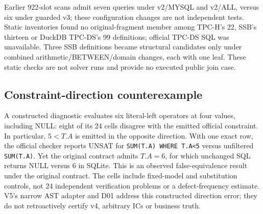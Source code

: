 Earlier 922-slot scans admit seven queries under v2/MYSQL and v2/ALL, versus six under guarded v3; these configuration changes are not independent tests. Static inventories found no original-fragment member among TPC-H's 22, SSB's thirteen or DuckDB TPC-DS's 99 definitions; official TPC-DS SQL was unavailable. Three SSB definitions became structural candidates only under combined arithmetic/BETWEEN/domain changes, each with one leaf. These static checks are not solver runs and provide no executed public join case.

\subsection{Constraint-direction counterexample}\label{sec:icdiagnostic}
A constructed diagnostic evaluates six literal-left operators at four values, including NULL: eight of its 24 cells disagree with the emitted official constraint. In particular, $5<T.A$ is emitted in the opposite direction. With one exact row, the official checker reports UNSAT for \texttt{SUM(T.A) WHERE T.A<5} versus unfiltered \texttt{SUM(T.A)}. Yet the original contract admits $T.A=6$, for which unchanged SQL returns NULL versus 6 in SQLite. This is an observed false-equivalence result under the original contract. The cells include fixed-model and substitution controls, not 24 independent verification problems or a defect-frequency estimate. V5's narrow AST adapter and D01 address this constructed direction error; they do not retroactively certify v4, arbitrary ICs or business truth.
